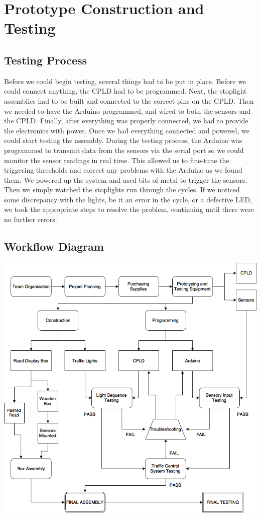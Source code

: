 \section{Prototype Construction and Testing}
\subsection{Testing Process}
Before we could begin testing, several things had to be put in place. Before we could connect anything, the CPLD had to be programmed.
Next, the stoplight assemblies had to be built and connected to the correct pins on the CPLD.
Then we needed to have the Arduino programmed, and wired to both the sensors and the CPLD.
Finally, after everything was properly connected, we had to provide the electronics with power.
Once we had everything connected and powered, we could start testing the assembly. During the testing process, the Arduino was programmed to
transmit data from the sensors via the serial port so we could monitor the sensor readings in real time.
This allowed us to fine-tune the triggering thresholds and correct any problems with the Arduino as we found them.
We powered up the system and used bits of metal to trigger the sensors. Then we simply watched the stoplights run through the cycles. If we noticed
some discrepancy with the lights, be it an error in the cycle, or a defective LED, we took the appropriate steps to resolve the problem,
continuing until there were no further errors.
\subsection{Workflow Diagram}
\includegraphics[scale=0.75]{DIGITALFLOW.png}